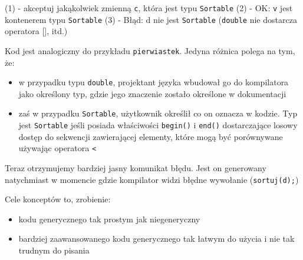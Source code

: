 \documentclass[11pt, a4paper]{article}
\begin{document}
\noindent (1) - akceptuj jakąkolwiek zmienną \verb#c#, która jest typu \verb#Sortable# \newline
(2) - OK: \verb#v# jest kontenerem typu \verb#Sortable# \newline
(3) - Błąd: d nie jest \verb#Sortable# (\verb#double# nie dostarcza operatora [], itd.) \newline

Kod jest analogiczny do przykładu \verb#pierwiastek#. Jedyna różnica polega na tym, że:
\begin{itemize}

\item w przypadku typu \verb#double#, projektant języka wbudował go do kompilatora jako określony typ, gdzie jego znaczenie zostało określone w dokumentacji

\item zaś w przypadku \verb#Sortable#, użytkownik określił co on oznacza w kodzie. Typ jest \verb#Sortable# jeśli posiada właściwości \verb#begin()# i \verb#end()# dostarczające losowy dostęp do sekwencji zawierającej elementy, które mogą być porównywane używając operatora \verb#<#

\end{itemize}

Teraz otrzymujemy bardziej jasny komunikat błędu. Jest on generowany natychmiast w momencie gdzie kompilator widzi błędne wywołanie (\verb#sortuj(d);#)\newline

Cele konceptów to, zrobienie:
\begin{itemize}

\item kodu generycznego tak prostym jak niegeneryczny

\item bardziej zaawansowanego kodu generycznego tak łatwym do użycia i nie tak trudnym do
pisania

\end{itemize}
\end{document}
